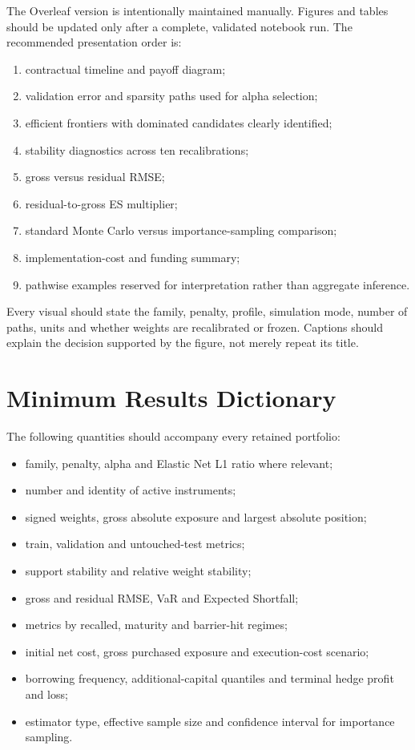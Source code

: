 \documentclass[11pt,a4paper]{article}
\begin{document}
The Overleaf version is intentionally maintained manually. Figures and tables should be updated only after a complete, validated notebook run. The recommended presentation order is:

\begin{enumerate}
\item contractual timeline and payoff diagram;
\item validation error and sparsity paths used for alpha selection;
\item efficient frontiers with dominated candidates clearly identified;
\item stability diagnostics across ten recalibrations;
\item gross versus residual RMSE;
\item residual-to-gross ES multiplier;
\item standard Monte Carlo versus importance-sampling comparison;
\item implementation-cost and funding summary;
\item pathwise examples reserved for interpretation rather than aggregate inference.
\end{enumerate}

Every visual should state the family, penalty, profile, simulation mode, number of paths, units and whether weights are recalibrated or frozen. Captions should explain the decision supported by the figure, not merely repeat its title.

\section{Minimum Results Dictionary}

The following quantities should accompany every retained portfolio:

\begin{itemize}
\item family, penalty, alpha and Elastic Net L1 ratio where relevant;
\item number and identity of active instruments;
\item signed weights, gross absolute exposure and largest absolute position;
\item train, validation and untouched-test metrics;
\item support stability and relative weight stability;
\item gross and residual RMSE, VaR and Expected Shortfall;
\item metrics by recalled, maturity and barrier-hit regimes;
\item initial net cost, gross purchased exposure and execution-cost scenario;
\item borrowing frequency, additional-capital quantiles and terminal hedge profit and loss;
\item estimator type, effective sample size and confidence interval for importance sampling.
\end{itemize}
\end{document}
